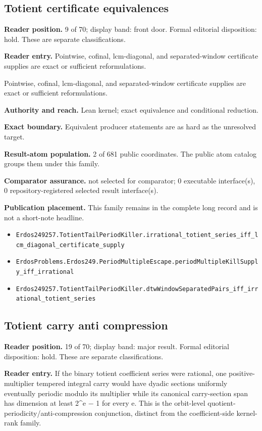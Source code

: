 \subsection{Totient certificate equivalences}
\textbf{Reader position.} 9 of 70; display band: front door.  Formal editorial disposition: hold.  These are separate classifications.

\textbf{Reader entry.} Pointwise, cofinal, lcm-diagonal, and separated-window certificate supplies are exact or sufficient reformulations.

Pointwise, cofinal, lcm-diagonal, and separated-window certificate supplies are exact or sufficient reformulations.

\textbf{Authority and reach.} Lean kernel; exact equivalence and conditional reduction.

\textbf{Exact boundary.} Equivalent producer statements are as hard as the unresolved target.

\textbf{Result-atom population.} 2 of 681 public coordinates. The public atom catalog groups them under this family.

\textbf{Comparator assurance.} not selected for comparator; 0 executable interface(s), 0 repository-registered selected result interface(s).

\textbf{Publication placement.} This family remains in the complete long record and is not a short-note headline.

\begin{itemize}
  \item \nolinkurl{Erdos249257.TotientTailPeriodKiller.irrational_totient_series_iff_lcm_diagonal_certificate_supply}
  \item \nolinkurl{ErdosProblems.Erdos249.PeriodMultipleEscape.periodMultipleKillSupply_iff_irrational}
  \item \nolinkurl{Erdos249257.TotientTailPeriodKiller.dtwWindowSeparatedPairs_iff_irrational_totient_series}
\end{itemize}

\subsection{Totient carry anti compression}
\textbf{Reader position.} 19 of 70; display band: major result.  Formal editorial disposition: hold.  These are separate classifications.

\textbf{Reader entry.} If the binary totient coefficient series were rational, one positive-multiplier tempered integral carry would have dyadic sections uniformly eventually periodic modulo its multiplier while its canonical carry-section span has dimension at least 2\textasciicircum{}e \ensuremath{-} 1 for every e. This is the orbit-level quotient-periodicity/anti-compression conjunction, distinct from the coefficient-side kernel-rank family.

